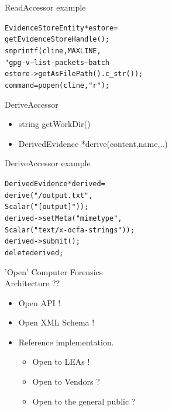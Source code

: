 \documentclass[pdf,contemporain,slideColor,colorBG,accumulate,nototal,capsules]{prosper}
\begin{document}
\begin{slide}{ReadAccessor example}
\begin{alltt}
EvidenceStoreEntity *estore=
  getEvidenceStoreHandle();
snprintf(cline,MAXLINE,
 "gpg -v --list-packets --batch %
 estore->getAsFilePath().c\_str());
command=popen(cline,"r");
\end{alltt}
\end{slide}
\begin{slide}{DeriveAccessor}
\begin{itemize}
\item string getWorkDir()
\item DerivedEvidence *derive(content,name,..)
\end{itemize}
\end{slide}
\begin{slide}{DeriveAccessor example}
\begin{alltt}
  DerivedEvidence *derived=
    derive("/output.txt",
  	   Scalar("[output]"));
  derived->setMeta("mimetype",
    Scalar("text/x-ocfa-strings"));
  derived->submit();
  delete derived;
\end{alltt}
\end{slide}
\begin{slide}{'Open' Computer Forensics \\
Architecture ??}
\begin{itemize}
\item Open API !
\item Open XML Schema !
\item Reference implementation.
\begin{itemize}
 \item Open to LEAs !
 \item Open to Vendors ?
 \item Open to the general public ?
\end{itemize}
\end{itemize}
\end{slide}
\end{document}
